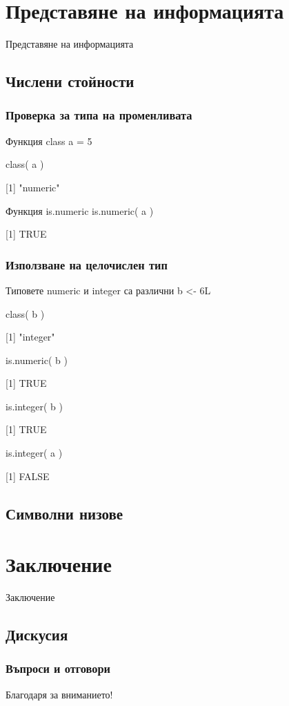 \documentclass{beamer}
\begin{document}
\section{Представяне на информацията}

\begin{frame}
\center \huge{Представяне на информацията}
\end{frame}

\subsection{Числени стойности}

\begin{frame}
\frametitle{Проверка за типа на променливата}
\begin{block}{Функция class}
a = 5

class( a )

[1] "numeric"
\end{block}

\begin{block}{Функция is.numeric}
is.numeric( a )

[1] TRUE
\end{block}
\end{frame}

\begin{frame}
\frametitle{Използване на целочислен тип}
\begin{block}{Типовете numeric и integer са различни}
b <- 6L

class( b )

[1] "integer"

is.numeric( b )

[1] TRUE

is.integer( b )

[1] TRUE

is.integer( a )

[1] FALSE
\end{block}
\end{frame}

\subsection{Символни низове}

\section{Заключение}

\begin{frame}
\center \huge{Заключение}
\end{frame}

\subsection{Дискусия}

\begin{frame}
\frametitle{Въпроси и отговори}
\center \huge{Благодаря за вниманието!}
\end{frame}
\end{document}
